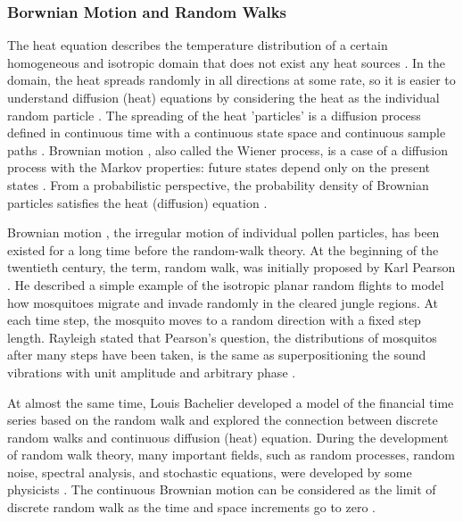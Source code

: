 \subsubsection{Borwnian Motion and Random Walks}

The heat equation describes the temperature distribution of a certain
homogeneous and isotropic domain that does not exist any heat sources
\cite{varadhan1980lectures}. In the domain, the heat spreads randomly
in all directions at some rate, so it is easier to understand
diffusion (heat) equations by considering the heat as the individual
random particle \cite{lawler2010random}. The spreading of the heat
'particles' is a diffusion process defined in continuous time with a
continuous state space and continuous sample paths
\cite{ito2012diffusion}. Brownian motion
\cite{brown1828microscopical}, also called the Wiener process, is a
case of a diffusion process with the Markov properties: future states
depend only on the present states \cite{bharucha2012elements}. From a
probabilistic perspective, the probability density of Brownian
particles satisfies the heat (diffusion) equation
\cite{kac1947random}\cite{varadhan1980lectures}.



Brownian motion \cite{brown1828microscopical}, the irregular motion of
individual pollen particles, has been existed for a long time before
the random-walk theory. At the beginning of the twentieth century, the
term, random walk, was initially proposed by Karl Pearson
\cite{pearson1905problem}. He described a simple example of the
isotropic planar random flights to model how mosquitoes migrate and
invade randomly in the cleared jungle regions. At each time step, the
mosquito moves to a random direction with a fixed step
length. Rayleigh \cite{rayleigh1905problem} stated that Pearson's
question, the distributions of mosquitos after many steps have been
taken, is the same as superpositioning the sound vibrations with unit
amplitude and arbitrary phase \cite{de2012flying}.


At almost the same time, Louis Bachelier \cite{bachelier1900theorie}
developed a model of the financial time series based on the random
walk and explored the connection between discrete random walks and
continuous diffusion (heat) equation. During the development of random
walk theory, many important fields, such as random processes, random
noise, spectral analysis, and stochastic equations, were developed by
some physicists \cite{einstein1905electrodynamics}
\cite{einstein1906theory} \cite{smoluchowski1916drei}. The continuous
Brownian motion can be considered as the limit of discrete random walk
as the time and space increments go to zero \cite{lawler2010random}.





